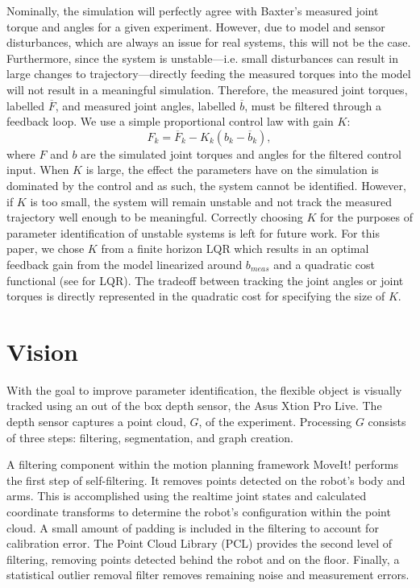 \documentclass[runningheads,a4paper]{llncs}
\begin{document}
Nominally, the simulation will perfectly agree with Baxter's measured joint torque and angles for a given experiment. However, due to model and sensor disturbances, which are always an issue for real systems, this will not be the case. Furthermore, since the system is unstable---i.e. small disturbances can result in large changes to trajectory---directly feeding the measured torques into the model will not result in a meaningful simulation. Therefore, the measured joint torques, labelled $\overline{F}$, and measured joint angles, labelled $\overline{b}$, must be filtered through a feedback loop. We use a simple proportional control law with gain $K$: 
\[
F_k = \overline{F}_k - K_k (b_k - \overline{b}_k),
\]
where $F$ and $b$ are the simulated joint torques and angles for the filtered control input.  When $K$ is large, the effect the parameters have on the simulation is dominated by the control and as such, the system cannot be identified. However, if $K$ is too small, the system will remain unstable and not track the measured trajectory well enough to be meaningful.  Correctly choosing $K$ for the purposes of parameter identification of unstable systems is left for future work.  For this paper, we chose $K$ from a finite horizon LQR which results in an optimal feedback gain from the model linearized around $b_{meas}$ and a quadratic cost functional (see \cite{anderson_moore} for LQR).  The tradeoff between tracking the joint angles or joint torques is directly represented in the quadratic cost for specifying the size of $K$.


\section{Vision}
\label{sec-vis}
With the goal to improve parameter identification, the flexible object is visually tracked using an out of the box depth sensor, the Asus Xtion Pro Live. The depth sensor captures a point cloud, $G$, of the experiment. Processing $G$ consists of three steps: filtering, segmentation, and graph creation. 

A filtering component within the motion planning framework MoveIt! \cite{coleman_etal_barrier} performs the first step of self-filtering. It removes points detected on the robot’s body and arms. This is accomplished using the realtime joint states and calculated coordinate transforms to determine the robot’s configuration within the point cloud. A small amount of padding is included in the filtering to account for calibration error. The Point Cloud Library (PCL) \cite{rusu20113d} provides the second level of filtering, removing points detected behind the robot and on the floor. Finally, a statistical outlier removal filter removes remaining noise and measurement errors.
\end{document}
